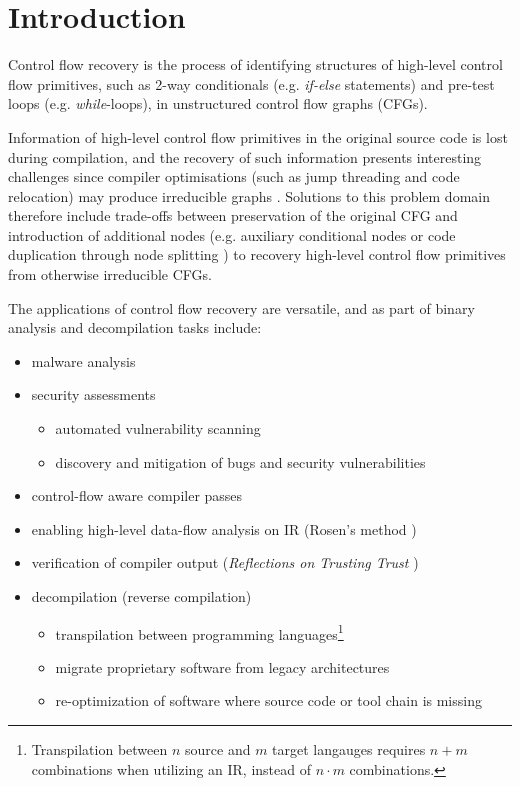 
\section{Introduction}

Control flow recovery is the process of identifying structures of high-level control flow primitives, such as 2-way conditionals (e.g. \textit{if-else} statements) and pre-test loops (e.g. \textit{while}-loops), in unstructured control flow graphs (CFGs).

Information of high-level control flow primitives in the original source code is lost during compilation, and the recovery of such information presents interesting challenges since compiler optimisations (such as jump threading and code relocation) may produce irreducible graphs \cite{cifuentes_reverse_comp}. Solutions to this problem domain therefore include trade-offs between preservation of the original CFG and introduction of additional nodes (e.g. auxiliary conditional nodes \cite{no_more_gotos} or code duplication through node splitting \cite{node_splitting}) to recovery high-level control flow primitives from otherwise irreducible CFGs.

The applications of control flow recovery are versatile, and as part of binary analysis and decompilation tasks include:

\begin{itemize}
	\item malware analysis
	\item security assessments
	\begin{itemize}
		\item automated vulnerability scanning
		\item discovery and mitigation of bugs and security vulnerabilities
	\end{itemize}
	\item control-flow aware compiler passes
	\item enabling high-level data-flow analysis on IR (Rosen's method \cite{rosen_method,advanced_compiler_design_implementation_book})
	\item verification of compiler output (\textit{Reflections on Trusting Trust} \cite{trusting_trust})
	\item decompilation (reverse compilation)
	\begin{itemize}
		\item transpilation between programming languages\footnote{Transpilation between $n$ source and $m$ target langauges requires $n + m$ combinations when utilizing an IR, instead of $n \cdot m$ combinations.}
		\item migrate proprietary software from legacy architectures
		\item re-optimization of software where source code or tool chain is missing
	\end{itemize}
\end{itemize}





